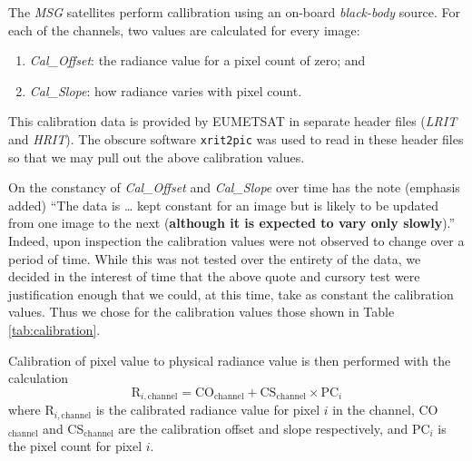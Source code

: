 The \emph{MSG} satellites perform callibration using an on-board
\emph{black-body} source. For each of the channels, two values are
calculated for every image:
\begin{enumerate}
\item \emph{Cal\_Offset}: the radiance value for a pixel count of
  zero; and
\item \emph{Cal\_Slope}: how radiance varies with pixel count.
\end{enumerate}
This calibration data is provided by EUMETSAT in separate header files
(\emph{LRIT} and \emph{HRIT}). The obscure software \texttt{xrit2pic}
was used to read in these header files so that we may pull out the
above calibration values.

On the constancy of \emph{Cal\_Offset} and \emph{Cal\_Slope} over time
\cite{muller2007msg} has the note (emphasis added) ``The data is \dots
kept constant for an image but is likely to be updated from one image
to the next (\textbf{although it is expected to vary only slowly}).''
Indeed, upon inspection the calibration values were not observed to
change over a period of time. While this was not tested over the
entirety of the data, we decided in the interest of time that the
above quote and cursory test were justification enough that we could,
at this time, take as constant the calibration values. Thus we chose
for the calibration values those shown in Table \ref{tab:calibration}.

\begin{table}
  \centering
  \caption{Calibration values for each band. It is assumed that these
    values vary only slowly, and so we have decided to use a single
    set of values.}
  \label{tab:calibration}
\end{table}

Calibration of pixel value to physical radiance value is then
performed with the calculation
\begin{equation}
    \textrm{R}_{i,\textrm{channel}} = \textrm{CO}_\textrm{channel} +
    \textrm{CS}_\textrm{channel} \times
    \textrm{PC}_i \label{eqn:calibration}
\end{equation}
where R$_{i,\textrm{channel}}$ is the calibrated radiance value for
pixel $i$ in the channel, CO$_\textrm{channel}$ and
CS$_\textrm{channel}$ are the calibration offset and slope
respectively, and PC$_i$ is the pixel count for pixel $i$.

